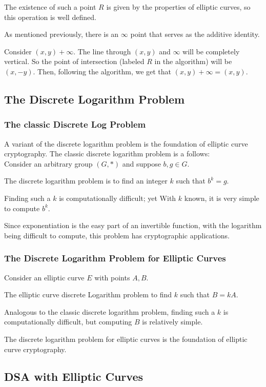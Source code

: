 The existence of such a point $R$ is given by the properties of elliptic curves,
so this operation is well defined.

As mentioned previously, there is an $\infty$ point that serves as the additive identity.

Consider $(x,y) + \infty$.
The line through $(x,y)$ and $\infty$ will be completely vertical.
So the point of intersection (labeled $R$ in the algorithm) will be $(x,-y)$.
Then, following the algorithm, we get that $(x,y) + \infty = (x,y)$.




\subsection{The Discrete Logarithm Problem}

\subsubsection{The classic Discrete Log Problem}
A variant of the discrete logarithm problem is the foundation of elliptic
curve cryptography.  The classic discrete logarithm problem is a follows:\\

Consider an arbitrary group $(G, *)$ and suppose $b,g \in G$.

The discrete logarithm problem is to find an integer $k$
such that $b^k = g$.

Finding such a $k$ is computationally difficult; yet
With $k$ known, it is very simple to compute $b^k$.

Since exponentiation is the easy part of an invertible function, with
the logarithm being difficult to compute, this problem has cryptographic
applications.


\subsubsection{The Discrete Logarithm Problem for Elliptic Curves}

Consider an elliptic curve $E$ with points $A,B$.

The elliptic curve discrete Logarithm problem to find $k$
such that $B = kA$.

Analogous to the classic discrete logarithm problem, finding such a $k$
is computationally difficult, but computing $B$ is relatively simple.

The discrete logarithm problem for elliptic curves is the foundation of
elliptic curve cryptography.



\subsection{DSA with Elliptic Curves}










